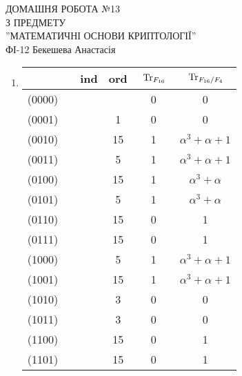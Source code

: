 \documentclass[a4paper,12pt]{article}
\newcommand{\Tr}[1]{\textrm{\hspace*{0.15cm}$\textrm{Tr}_{#1}$\hspace*{0.1cm}}}
\begin{document}
	\begin{justify}
		\thispagestyle{empty}\setlength{\parindent}{0pt}
 		\vspace*{\fill}
  		\begin{center}
  			\noindent\makebox[\linewidth]{\rule{\paperwidth}{0.4pt}}
   			\LARGE{\bigbreak ДОМАШНЯ РОБОТА №13\\З ПРЕДМЕТУ\\''МАТЕМАТИЧНІ ОСНОВИ КРИПТОЛОГІЇ''\\\bigbreak} 
   			ФІ-12 Бекешева Анастасія 
   			\noindent\makebox[\linewidth]{\rule{\paperwidth}{0.4pt}}
  		\end{center}
 		\vspace*{\fill}\newpage
 		\begin{enumerate}
 			\item \begin{table}[htp]\centering
\begin{tabular}{|c|c|c|c|c|c|}
\hline
       &  & ind & ord & $\Tr{F_{16}}$ & $\Tr{F_{16}/F_4}$   \\ \hline
(0000) &  &     &     & 0            & 0                   \\ \hline
(0001) &  &     & 1   & 0            & 0                   \\ \hline
(0010) &  &     & 15  & 1            & $\alpha^3+\alpha+1$ \\ \hline
(0011) &  &     & 5   & 1            & $\alpha^3+\alpha+1$ \\ \hline
(0100) &  &     & 15  & 1            & $\alpha^3+\alpha$   \\ \hline
(0101) &  &     & 5   & 1            & $\alpha^3+\alpha$   \\ \hline
(0110) &  &     & 15  & 0            & 1                   \\ \hline
(0111) &  &     & 15  & 0            & 1                   \\ \hline
(1000) &  &     & 5   & 1            & $\alpha^3+\alpha+1$ \\ \hline
(1001) &  &     & 15  & 1            & $\alpha^3+\alpha+1$ \\ \hline
(1010) &  &     & 3   & 0            & 0                   \\ \hline
(1011) &  &     & 3   & 0            & 0                   \\ \hline
(1100) &  &     & 15  & 0            & 1                   \\ \hline
(1101) &  &     & 15  & 0            & 1                   \\ \hline

\end{tabular}
\end{table}
\end{enumerate}
\end{justify}
\end{document}
